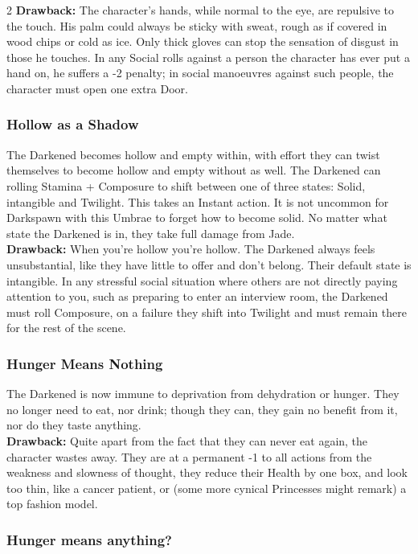 \begin{multicols}{2}
\noindent  \textbf{Drawback:} The character’s hands, while normal to the eye, are repulsive to the touch. His palm could always be sticky with sweat, rough as if covered in wood chips or cold as ice. Only thick gloves can stop the sensation of disgust in those he touches. In any Social rolls against a person the character has ever put a hand on, he suffers a -2 penalty; in social manoeuvres against such people, the character must open one extra Door.


\subsubsection*{Hollow as a Shadow}
The Darkened becomes hollow and empty within, with effort they can twist themselves to become hollow and empty without as well. The Darkened can rolling Stamina + Composure to shift between one of three states: Solid, intangible and Twilight. This takes an Instant action. It is not uncommon for Darkspawn with this Umbrae to forget how to become solid. No matter what state the Darkened is in, they take full damage from Jade. \\

\noindent \textbf{Drawback:} When you're hollow you're hollow. The Darkened always feels unsubstantial, like they have little to offer and don't belong. Their default state is intangible. In any stressful social situation where others are not directly paying attention to you, such as preparing to enter an interview room, the Darkened must roll Composure, on a failure they shift into Twilight and must remain there for the rest of the scene. 
\subsubsection*{Hunger Means Nothing}
The Darkened is now immune to deprivation from dehydration or hunger. They no longer need to eat, nor drink; though they can, they gain no benefit from it, nor do they taste anything. \\

\noindent  \textbf{Drawback:} Quite apart from the fact that they can never eat again, the character wastes away. They are at a permanent -1 to all actions from the weakness and slowness of thought, they reduce their Health by one box, and look too thin, like a cancer patient, or (some more cynical Princesses might remark) a top fashion model. 

\begin{mybox}

\subsubsection*{Hunger means anything?}


\end{mybox}
\end{multicols}
